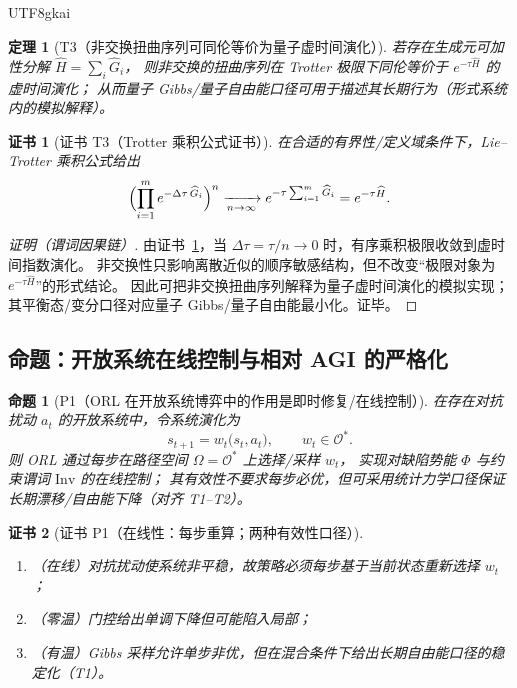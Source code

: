 \documentclass[12pt]{article}
\newtheorem{theorem}{定理}[section]
\newtheorem{proposition}{命题}[section]
\newtheorem{Certificate}{证书}[section]
\begin{document}
\begin{CJK*}{UTF8}{gkai}
\begin{theorem}[T3（非交换扭曲序列可同伦等价为量子虚时间演化）]
\label{thm:tex27-ch10-t3}
若存在生成元可加性分解 $\widehat{H}=\sum_i\widehat{G}_i$，
则非交换的扭曲序列在 Trotter 极限下同伦等价于 $e^{-\tau\widehat{H}}$ 的虚时间演化；
从而量子 Gibbs/量子自由能口径可用于描述其长期行为（形式系统内的模拟解释）。
\end{theorem}

\begin{Certificate}[证书 T3（Trotter 乘积公式证书）]
\label{cert:tex27-ch10-t3}
在合适的有界性/定义域条件下，Lie--Trotter 乘积公式给出
\[
  \Bigl(\prod_{i=1}^m e^{-\Delta\tau\,\widehat{G}_i}\Bigr)^{n}
  \xrightarrow[n\to\infty]{}
  e^{-\tau\sum_{i=1}^m \widehat{G}_i}=e^{-\tau\widehat{H}}.
\]
\end{Certificate}

\begin{proof}[证明（谓词因果链）]
由证书~\ref{cert:tex27-ch10-t3}，当 $\Delta\tau=\tau/n\to 0$ 时，有序乘积极限收敛到虚时间指数演化。
非交换性只影响离散近似的顺序敏感结构，但不改变“极限对象为 $e^{-\tau\widehat{H}}$”的形式结论。
因此可把非交换扭曲序列解释为量子虚时间演化的模拟实现；其平衡态/变分口径对应量子 Gibbs/量子自由能最小化。证毕。
\end{proof}

\subsection{命题：开放系统在线控制与相对 AGI 的严格化}
\label{subsec:tex27-ch10-props}

\begin{proposition}[P1（ORL 在开放系统博弈中的作用是即时修复/在线控制）]
\label{prop:tex27-ch10-p1}
在存在对抗扰动 $a_t$ 的开放系统中，令系统演化为
\[
  s_{t+1}=w_t\bigl(s_t,a_t\bigr),
  \qquad
  w_t\in\mathcal{O}^*.
\]
则 ORL 通过每步在路径空间 $\Omega=\mathcal{O}^*$ 上选择/采样 $w_t$，
实现对缺陷势能 $\Phi$ 与约束谓词 $\mathrm{Inv}$ 的在线控制；
其有效性不要求每步必优，但可采用统计力学口径保证长期漂移/自由能下降（对齐 T1--T2）。
\end{proposition}

\begin{Certificate}[证书 P1（在线性：每步重算；两种有效性口径）]
\label{cert:tex27-ch10-p1}
\begin{enumerate}
  \item（在线）对抗扰动使系统非平稳，故策略必须每步基于当前状态重新选择 $w_t$；
  \item（零温）门控给出单调下降但可能陷入局部；
  \item（有温）Gibbs 采样允许单步非优，但在混合条件下给出长期自由能口径的稳定化（T1）。
\end{enumerate}
\end{Certificate}


\end{CJK*}
\end{document}
